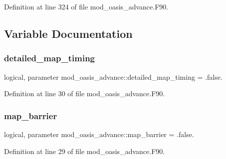 Definition at line 324 of file mod\+\_\+oasis\+\_\+advance.\+F90.



\subsection{Variable Documentation}
\mbox{\label{namespacemod__oasis__advance_aad8e5c2e16b0270a7da0800a14ae1e07}} 
\subsubsection{\texorpdfstring{detailed\+\_\+map\+\_\+timing}{detailed\_map\_timing}}
{\footnotesize\ttfamily logical, parameter mod\+\_\+oasis\+\_\+advance\+::detailed\+\_\+map\+\_\+timing = .false.\hspace{0.3cm}{\ttfamily [private]}}



Definition at line 30 of file mod\+\_\+oasis\+\_\+advance.\+F90.

\mbox{\label{namespacemod__oasis__advance_ac617024af9299c27eaeb9156f647b028}} 
\subsubsection{\texorpdfstring{map\+\_\+barrier}{map\_barrier}}
{\footnotesize\ttfamily logical, parameter mod\+\_\+oasis\+\_\+advance\+::map\+\_\+barrier = .false.\hspace{0.3cm}{\ttfamily [private]}}



Definition at line 29 of file mod\+\_\+oasis\+\_\+advance.\+F90.

